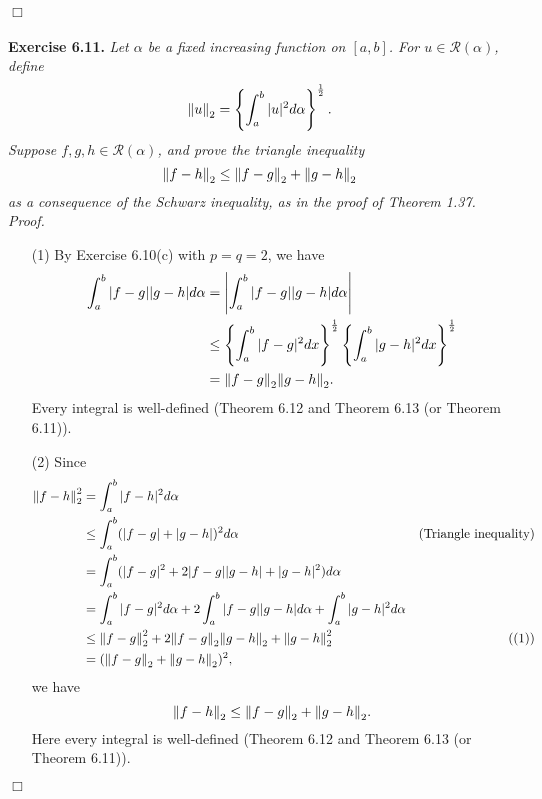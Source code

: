 \documentclass{article}
\begin{document}
$\Box$ \\\\






\textbf{Exercise 6.11.}
\emph{Let $\alpha$ be a fixed increasing function on $[a,b]$.
For $u \in \mathscr{R}(\alpha)$, define
\[
  \norm{u}_2 = \left\{ \int_{a}^{b} |u|^2 d\alpha \right\}^{\frac{1}{2}}.
\]
Suppose $f,g,h \in \mathscr{R}(\alpha)$, and prove the triangle inequality
\[
  \norm{f-h}_2 \leq \norm{f-g}_2 + \norm{g-h}_2
\]
as a consequence of the Schwarz inequality, as in the proof of Theorem 1.37.} \\

\emph{Proof.}
\begin{enumerate}
\item[(1)]
By Exercise 6.10(c) with $p=q=2$, we have
\begin{align*}
  \int_{a}^{b} |f-g||g-h| d\alpha
  &=
    \abs{ \int_{a}^{b} |f-g||g-h| d\alpha } \\
  &\leq
    \left\{ \int_{a}^{b} |f-g|^2 dx \right\}^{\frac{1}{2}}
    \left\{ \int_{a}^{b} |g-h|^2 dx \right\}^{\frac{1}{2}} \\
  &= \norm{f-g}_2 \norm{g-h}_2.
\end{align*}
Every integral is well-defined (Theorem 6.12 and Theorem 6.13 (or Theorem 6.11)).

\item[(2)]
Since
\begin{align*}
  \norm{f-h}_2^2
  &= \int_{a}^{b} |f-h|^2 d\alpha \\
  &\leq \int_{a}^{b} (|f-g|+|g-h|)^2 d\alpha
    &\text{(Triangle inequality)} \\
  &= \int_{a}^{b} (|f-g|^2 + 2|f-g||g-h| + |g-h|^2) d\alpha \\
  &= \int_{a}^{b} |f-g|^2 d\alpha
    + 2\int_{a}^{b} |f-g||g-h| d\alpha
    + \int_{a}^{b} |g-h|^2 d\alpha \\
  &\leq
    \norm{f-g}_2^2 + 2 \norm{f-g}_2 \norm{g-h}_2 + \norm{g-h}_2^2
    &\text{((1))} \\
  &= (\norm{f-g}_2 + \norm{g-h}_2)^2,
\end{align*}
we have
\[
  \norm{f-h}_2 \leq \norm{f-g}_2 + \norm{g-h}_2.
\]
Here every integral is well-defined (Theorem 6.12 and Theorem 6.13 (or Theorem 6.11)).

\end{enumerate}
$\Box$ \\\\
\end{document}
